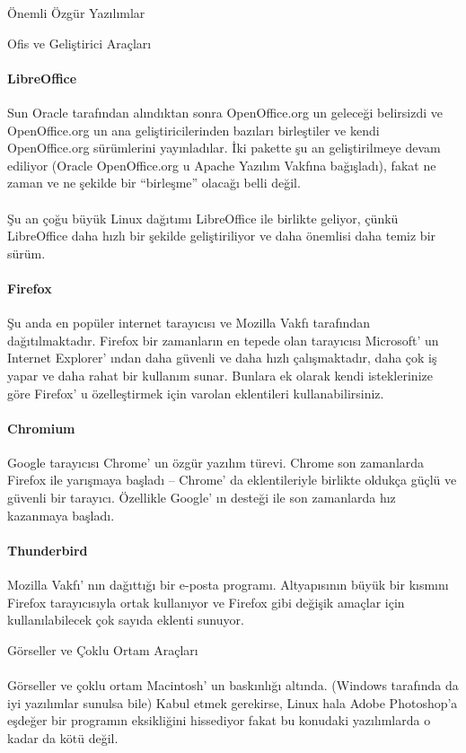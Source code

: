 \documentclass[10pt,a5paper]{book}
\begin{document}
\begin{section}{Önemli Özgür Yazılımlar}
\begin{subsection}{Ofis ve Geliştirici Araçları}
\paragraph{LibreOffice}{Sun Oracle tarafından alındıktan sonra OpenOffice.org un geleceği belirsizdi ve OpenOffice.org un ana geliştiricilerinden bazıları birleştiler ve kendi OpenOffice.org sürümlerini yayınladılar. İki pakette şu an geliştirilmeye devam ediliyor (Oracle OpenOffice.org u Apache Yazılım Vakfına bağışladı), fakat ne zaman ve ne şekilde bir “birleşme” olacağı belli değil.}
\paragraph{}{Şu an çoğu büyük Linux dağıtımı LibreOffice ile birlikte geliyor, çünkü LibreOffice daha hızlı bir şekilde geliştiriliyor ve daha önemlisi daha temiz bir sürüm.}
\paragraph{Firefox}{Şu anda en popüler internet tarayıcısı ve Mozilla Vakfı tarafından dağıtılmaktadır. Firefox bir zamanların en tepede olan tarayıcısı Microsoft' un Internet Explorer' ından daha güvenli ve daha hızlı çalışmaktadır, daha çok iş yapar ve daha rahat bir kullanım sunar. Bunlara ek olarak kendi isteklerinize göre Firefox' u özelleştirmek için varolan eklentileri kullanabilirsiniz.}
\paragraph{Chromium}{Google tarayıcısı Chrome' un özgür yazılım türevi. Chrome son zamanlarda Firefox ile yarışmaya başladı – Chrome' da eklentileriyle birlikte oldukça güçlü ve güvenli bir tarayıcı. Özellikle Google' ın desteği ile son zamanlarda hız kazanmaya başladı.}
\paragraph{Thunderbird}{Mozilla Vakfı' nın dağıttığı bir e-posta programı. Altyapısının büyük bir kısmını Firefox tarayıcısıyla ortak kullanıyor ve Firefox gibi değişik amaçlar için kullanılabilecek çok sayıda eklenti sunuyor.}
\end{subsection}
\begin{subsection}{Görseller ve Çoklu Ortam Araçları}
\paragraph{}{Görseller ve çoklu ortam Macintosh' un baskınlığı altında. (Windows tarafında da iyi yazılımlar sunulsa bile) Kabul etmek gerekirse, Linux hala Adobe Photoshop'a eşdeğer bir programın eksikliğini hissediyor fakat bu konudaki yazılımlarda o kadar da kötü değil.}

\end{subsection}
\end{section}
\end{document}
